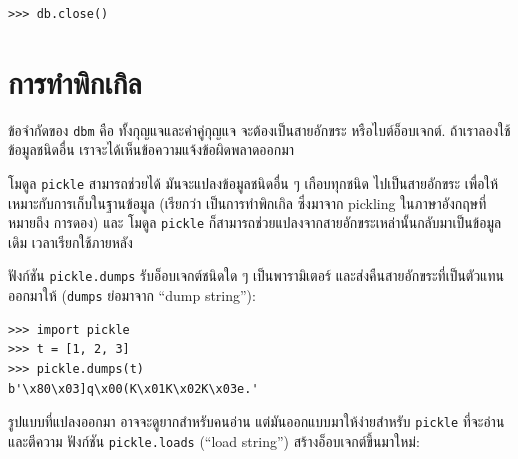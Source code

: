 \begin{verbatim}
>>> db.close()
\end{verbatim}
%


\section{การทำพิกเกิล}


ข้อจำกัดของ \texttt{dbm} คือ ทั้งกุญแจและค่าคู่กุญแจ จะต้องเป็นสายอักขระ หรือไบต์อ็อบเจกต์.
ถ้าเราลองใช้ข้อมูลชนิดอื่น เราจะได้เห็นข้อความแจ้งข้อผิดพลาดออกมา
 


โมดูล \texttt{pickle} สามารถช่วยได้
มันจะแปลงข้อมูลชนิดอื่น ๆ เกือบทุกชนิด
ไปเป็นสายอักขระ เพื่อให้เหมาะกับการเก็บในฐานข้อมูล 
(เรียกว่า เป็นการทำพิกเกิล ซึ่งมาจาก pickling ในภาษาอังกฤษที่หมายถึง การดอง)
และ โมดูล \texttt{pickle} ก็สามารถช่วยแปลงจากสายอักขระเหล่านั้นกลับมาเป็นข้อมูลเดิม เวลาเรียกใช้ภายหลัง


ฟังก์ชัน \texttt{pickle.dumps} รับอ็อบเจกต์ชนิดใด ๆ เป็นพารามิเตอร์
และส่งคืนสายอักขระที่เป็นตัวแทนออกมาให้ 
(\texttt{dumps} ย่อมาจาก ``dump string''):

\begin{verbatim}
>>> import pickle
>>> t = [1, 2, 3]
>>> pickle.dumps(t)
b'\x80\x03]q\x00(K\x01K\x02K\x03e.'
\end{verbatim}
%
%
รูปแบบที่แปลงออกมา อาจจะดูยากสำหรับคนอ่าน
แต่มันออกแบบมาให้ง่ายสำหรับ \texttt{pickle} ที่จะอ่านและตีความ
ฟังก์ชัน \texttt{pickle.loads} (``load string'') สร้างอ็อบเจกต์ขึ้นมาใหม่:

